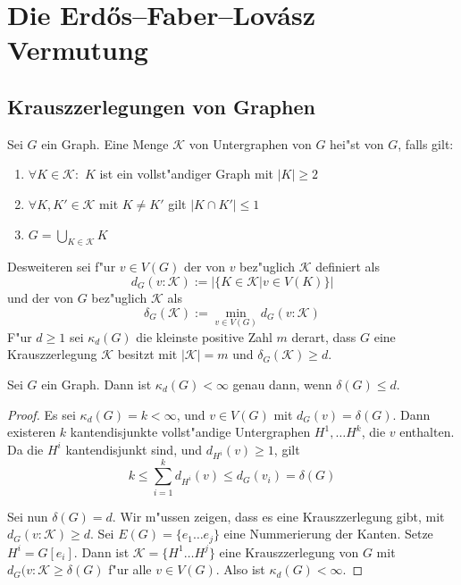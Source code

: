 \section{Die Erd\H{o}s--Faber--Lov\'asz Vermutung}
\label{sec:EFL-Vermutung}


\subsection{Krauszzerlegungen von Graphen}
\label{ssec:Krauszzerlegung}
\begin{definition}
    \label{def:Krauszzerlegung}
    Sei $G$ ein Graph. Eine Menge $\mathcal K$ von Untergraphen von $G$ hei"st  von $G$, falls gilt:
    \begin{enumerate}[label=(\roman*)]
        \item $\forall K \in \mathcal K:$ $K$ ist ein vollst"andiger Graph mit $|K| \geq 2$
        \item $\forall K, K'\in \mathcal K$ mit $K\neq K'$ gilt $|K\cap K'| \leq 1$
        \item $G=\bigcup\limits_{K\in \mathcal K}K$
    \end{enumerate}
    Desweiteren sei f"ur $v\in V(G)$ der  von $v$ bez"uglich $\mathcal K$ definiert als $$d_G(v:\mathcal K) := |\{ K\in\mathcal K| v \in V(K)\}|$$ und der  von $G$ bez"uglich $\mathcal K$ als $$\delta_G(\mathcal K) := \min\limits_{v\in V(G)}d_G(v:\mathcal K)$$ 
    F"ur $d \geq 1$ sei $\kappa_d(G)$ die kleinste positive Zahl $m$ derart, dass $G$ eine Krauszzerlegung $\mathcal K$ besitzt mit $|\mathcal K| = m$ und $\delta_G(\mathcal K) \geq d$.
\end{definition}

\begin{lemma}
  Sei $G$ ein Graph. Dann ist $\kappa_d(G) < \infty$ genau dann, wenn $\delta(G) \leq d$.
  \label{lm:krauszexistenz}
\end{lemma}

\begin{proof}
  Es sei $\kappa_d(G) = k< \infty$, und $v \in V(G)$ mit $d_G(v) = \delta(G)$. Dann existeren $k$ kantendisjunkte vollst"andige Untergraphen $H^{1},\dots H^{k}$, die $v$ enthalten. 
  Da die $H^{i}$ kantendisjunkt sind, und $d_{H^{i}}(v) \geq 1$, gilt 
  \[ k \leq \sum\limits_{i=1}^{k} d_{H^{i}}(v) \leq d_G(v_i) = \delta(G) \]

  Sei nun $\delta(G) = d$. Wir m"ussen zeigen, dass es eine Krauszzerlegung  gibt, mit $d_{G}(v:\mathcal{K}) \geq d$. Sei $E(G)= \{e_1\dots e_{j}\}$ eine Nummerierung der Kanten. Setze $H^{i}= G[e_i]$. Dann ist $\mathcal{K} = \{H^{1}\dots H^{j}\}$ eine Krauszzerlegung von $G$ mit $d_{G}(v:\mathcal{K} \geq \delta(G)$ f"ur alle $v\in V(G)$. Also ist $\kappa_d(G) <\infty$.

\end{proof}
